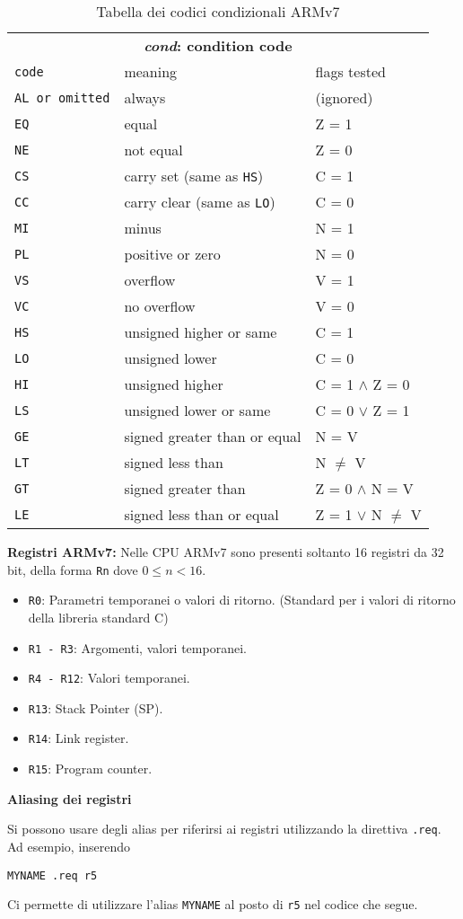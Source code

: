 \def\code#1#2#3{\texttt{#1} & \small #2 & #3\\}
\begin{table}[H]
	\centering
	\caption{Tabella dei codici condizionali ARMv7}
	\begin{tabular}{l@{\hspace{5mm}}ll}
		\multicolumn{3}{c}{\bfseries \emph{cond}: condition code} \\
		\code{code}{meaning}{flags tested}
		\hline
		\code{AL \textrm{or omitted}}{always}{(ignored)}
		\code{EQ}{equal}{Z = 1}
		\code{NE}{not equal}{Z = 0}
		\code{CS}{carry set (same as \texttt{HS})}{C = 1}
		\code{CC}{carry clear (same as \texttt{LO})}{C = 0}
		\code{MI}{minus}{N = 1}
		\code{PL}{positive or zero}{N = 0}
		\code{VS}{overflow}{V = 1}
		\code{VC}{no overflow}{V = 0}
		\code{HS}{unsigned higher or same}{C = 1}
		\code{LO}{unsigned lower}{C = 0}
		\code{HI}{unsigned higher}{C = 1 $\wedge$ Z = 0}
		\code{LS}{unsigned lower or same}{C = 0 $\vee$ Z = 1}
		\code{GE}{signed greater than or equal}{N = V}
		\code{LT}{signed less than}{N $\neq$ V}
		\code{GT}{signed greater than}{Z = 0 $\wedge$ N = V}
		\code{LE}{signed less than or equal}{Z = 1 $\vee$ N $\neq$ V}\hline

	\end{tabular}
\end{table}

\begin{defn}
\textbf{Registri ARMv7:}
Nelle CPU ARMv7 sono presenti soltanto 16 registri da 32 bit, della forma \verb|Rn| dove $ 0 \leq n < 16 $.

\begin{itemize}
	\item \verb|R0|: Parametri temporanei o valori di ritorno. (Standard per i valori di ritorno della libreria standard C)
	\item \verb|R1 - R3|: Argomenti, valori temporanei.
	\item \verb|R4 - R12|: Valori temporanei.
	\item \verb|R13|: Stack Pointer (SP).
	\item \verb|R14|: Link register.
	\item \verb|R15|: Program counter.
\end{itemize}
\end{defn}


\begin{defn}
	\textbf{Aliasing dei registri}

	Si possono usare degli alias per riferirsi ai registri utilizzando la direttiva
	\verb|.req|. Ad esempio, inserendo
\begin{lstlisting}[style=arm]
	MYNAME .req r5
\end{lstlisting}
	Ci permette di utilizzare l'alias \verb|MYNAME| al posto di \verb|r5| nel codice che segue.
\end{defn}

